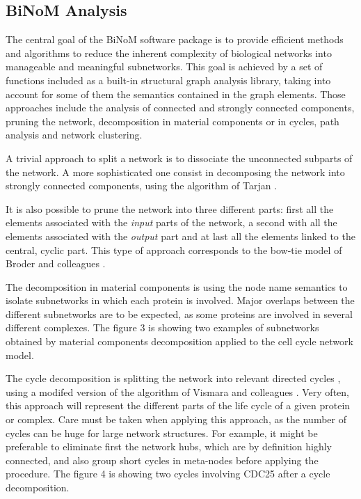 \documentclass[10pt]{bmc_article}
\newenvironment{bmcformat}{\baselineskip20pt\sloppy\setboolean{publ}{false}}{\baselineskip20pt\sloppy}
\begin{document}
\begin{bmcformat}
\subsection*{BiNoM Analysis}
The central goal of the BiNoM software package is to provide efficient methods
and algorithms to reduce the inherent complexity of biological networks into
manageable and meaningful subnetworks. This goal is achieved by a set of
functions included as a built-in structural graph analysis library, taking into
account for some of them the semantics contained in the graph elements. Those
approaches include the analysis of connected and strongly connected components,
pruning the network, decomposition in material components or in cycles, path
analysis and network clustering.

A trivial approach to split a network is to dissociate the unconnected subparts
of the network. A more sophisticated one consist in decomposing the network into
strongly connected components, using the algorithm of Tarjan
\cite{tarjan1972depth}.

It is also possible to prune the network into three different parts:
first all the elements associated with the \emph{input} parts of the network, a
second with all the elements associated with the \emph{output} part and at last
all the elements linked to the central, cyclic part. This type of approach
corresponds to the bow-tie model of Broder and colleagues \cite{broder2000graph}.

The decomposition in material components is using the node name semantics to
isolate subnetworks in which each protein is involved. Major overlaps between
the different subnetworks are to be expected, as some proteins are involved in
several different complexes. The figure 3 is showing two examples of subnetworks
obtained by material components decomposition applied to the cell cycle network
model.

The cycle decomposition is splitting the network into relevant directed cycles
\cite{gleiss2001relevant}, using a modifed version of the algorithm of Vismara
and colleagues \cite{vismara1997union}. Very often, this approach will represent
the different parts of the life cycle of a given protein or complex. Care must
be taken when applying this approach, as the number of cycles can be huge for
large network structures. For example, it might be preferable to eliminate first
the network hubs, which are by definition highly connected, and also group short
cycles in meta-nodes before applying the procedure. The figure 4 is showing two
cycles involving CDC25 after a cycle decomposition.


\end{bmcformat}
\end{document}
